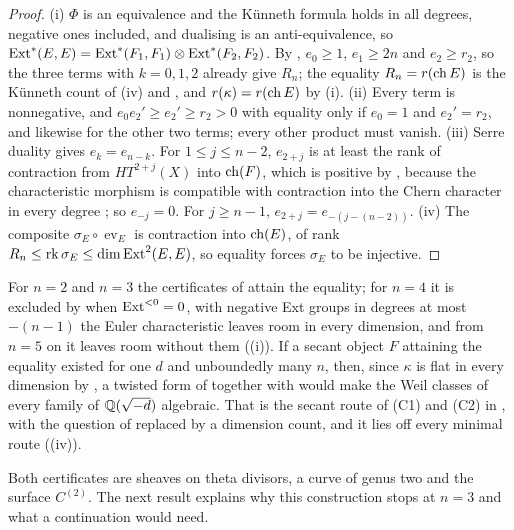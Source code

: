 \begin{proof}
(i) $\Phi$ is an equivalence and the K\"unneth formula holds in all degrees,
negative ones included, and dualising is an anti-equivalence, so
$\operatorname{Ext}^{*}(E,E)=\operatorname{Ext}^{*}(F_{1},F_{1})\otimes\operatorname{Ext}^{*}(F_{2},F_{2})$. By
, $e_{0}\ge1$, $e_{1}\ge2n$ and $e_{2}\ge r_{2}$, so the
three terms with $k=0,1,2$ already give $R_{n}$; the equality $R_{n}=r(\operatorname{ch} E)$ is
the K\"unneth count of (iv) and , and
$r(\kappa)=r(\operatorname{ch} E)$ by (i). (ii) Every term is nonnegative,
and $e_{0}e_{2}'\ge e_{2}'\ge r_{2}>0$ with equality only if $e_{0}=1$ and
$e_{2}'=r_{2}$, and likewise for the other two terms; every other product must
vanish. (iii) Serre duality gives $e_{k}=e_{n-k}$. For $1\le j\le n-2$, $e_{2+j}$ is
at least the rank of contraction from $HT^{2+j}(X)$ into $\operatorname{ch}(F)$, which is
positive by , because the characteristic morphism is
compatible with contraction into the Chern character in every degree
\cite{CRV12}; so $e_{-j}=0$. For $j\ge n-1$, $e_{2+j}=e_{-(j-(n-2))}$.
(iv) The composite $\sigma_{E}\circ\operatorname{ev}_{E}$
is contraction into $\operatorname{ch}(E)$, of rank $R_{n}\le\operatorname{rk}\sigma_{E}\le
\dim\operatorname{Ext}^{2}(E,E)$, so equality forces $\sigma_{E}$ to be injective.
\end{proof}

For $n=2$ and $n=3$ the certificates of  attain the
equality; for $n=4$ it is excluded by  when
$\operatorname{Ext}^{<0}=0$, with negative Ext groups in degrees at most $-(n-1)$ the
Euler characteristic leaves room in every dimension, and from $n=5$ on it
leaves room without them ((i)). If a secant object $F$
attaining the equality existed for one $d$ and unboundedly many $n$, then,
since $\kappa$ is flat in every dimension by
, a twisted form of  together with
 would make the Weil classes of every family of
$\mathbb{Q}(\sqrt{-d})$ algebraic. That is the secant route of (C1) and (C2) in
, with the question of \cite{Mar25b} replaced by a
dimension count, and it lies off every minimal route ((iv)).

Both certificates are sheaves on theta divisors, a curve of genus two and the
surface $C^{(2)}$. The next result explains why this construction stops at
$n=3$ and what a continuation would need.

